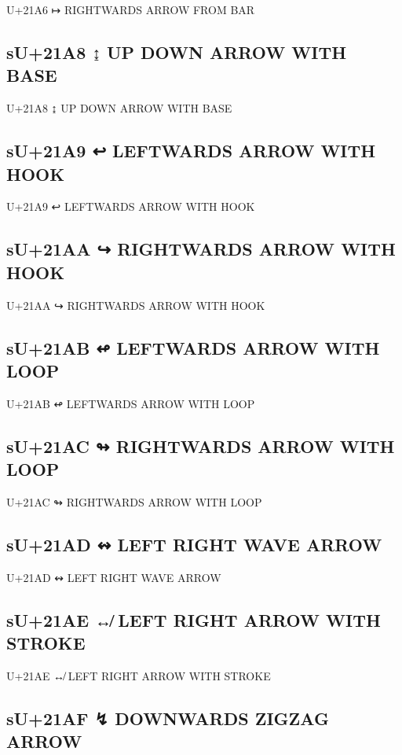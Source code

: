 U+21A6 ↦ RIGHTWARDS ARROW FROM BAR

\subsection{sU+21A8 ↨ UP DOWN ARROW WITH BASE}

U+21A8 ↨ UP DOWN ARROW WITH BASE

\subsection{sU+21A9 ↩ LEFTWARDS ARROW WITH HOOK}

U+21A9 ↩ LEFTWARDS ARROW WITH HOOK

\subsection{sU+21AA ↪ RIGHTWARDS ARROW WITH HOOK}

U+21AA ↪ RIGHTWARDS ARROW WITH HOOK

\subsection{sU+21AB ↫ LEFTWARDS ARROW WITH LOOP}

U+21AB ↫ LEFTWARDS ARROW WITH LOOP

\subsection{sU+21AC ↬ RIGHTWARDS ARROW WITH LOOP}

U+21AC ↬ RIGHTWARDS ARROW WITH LOOP

\subsection{sU+21AD ↭ LEFT RIGHT WAVE ARROW}

U+21AD ↭ LEFT RIGHT WAVE ARROW

\subsection{sU+21AE ↮ LEFT RIGHT ARROW WITH STROKE}

U+21AE ↮ LEFT RIGHT ARROW WITH STROKE

\subsection{sU+21AF ↯ DOWNWARDS ZIGZAG ARROW}

